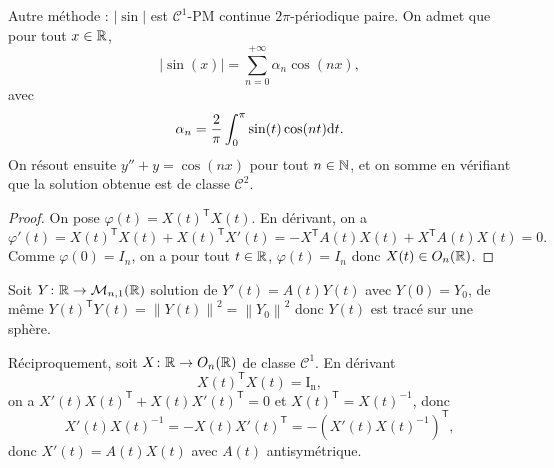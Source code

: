 \documentclass[12pt]{article}
\begin{document}
\begin{remark}
	Autre méthode : $\left\lvert\sin\right\rvert$ est $\mathcal{C}^{1}$-PM continue $2\pi$-périodique paire. On admet que pour tout $x\in\mathbb{R}$, 
	\begin{equation*}
		\left\lvert\sin(x)\right\rvert=\sum_{n=0}^{+\infty}\alpha_n \cos(nx),
	\end{equation*}
	avec 
	\begin{equation*}
		\alpha_n=\frac{2}{\pi}\int_{0}^{\pi}\sin(t)\cos(nt)\mathrm{d} t.
	\end{equation*}
	On résout ensuite $y''+y=\cos(nx)$ pour tout $n\in\mathbb{N}$, et on somme en vérifiant que la solution obtenue est de classe $\mathcal{C}^{2}$.
\end{remark}

\begin{proof}
	On pose $\varphi(t)=X(t)^{\mathsf{T}}X(t)$. En dérivant, on a 
	\begin{equation*}
		\varphi'(t)=X(t)^{\mathsf{T}}X(t)+X(t)^{\mathsf{T}}X'(t)=-X^{\mathsf{T}}A(t)X(t)+X^{\mathsf{T}}A(t)X(t)=0.
	\end{equation*}
	Comme $\varphi(0)=I_n$, on a pour tout $t\in\mathbb{R}$, $\varphi(t)=I_n$ donc $X(t)\in O_n(\mathbb{R})$.
\end{proof}

\begin{remark}
	Soit $Y\colon \mathbb{R}\to\mathcal{M}_{n,1}(\mathbb{R})$ solution de $Y'(t)=A(t)Y(t)$ avec $Y(0)=Y_0$, de même $Y(t)^{ \mathsf{T}}Y(t)=\left\lVert Y(t)\right\rVert^{2}=\left\lVert Y_0\right\rVert^{2}$ donc $Y(t)$ est tracé sur une sphère.
\end{remark}

\begin{remark}
	Réciproquement, soit $X\colon\mathbb{R}\to O_n(\mathbb{R})$ de classe $\mathcal{C}^{1}$. En dérivant 
	\begin{equation*}
		X(t)^{\mathsf{T}}X(t)=\mathrm{I_n},	
	\end{equation*}
	on a $X'(t)X(t)^{\mathsf{T}}+X(t)X'(t)^{\mathsf{T}}=0$ et $X(t)^{\mathsf{T}}=X(t)^{-1}$, donc 
	\begin{equation*}
		X'(t)X(t)^{-1}=-X(t)X'(t)^{\mathsf{T}}=-(X'(t)X(t)^{-1})^{\mathsf{T}},
	\end{equation*}
	donc $X'(t)=A(t)X(t)$ avec $A(t)$ antisymétrique.
\end{remark}
\end{document}
